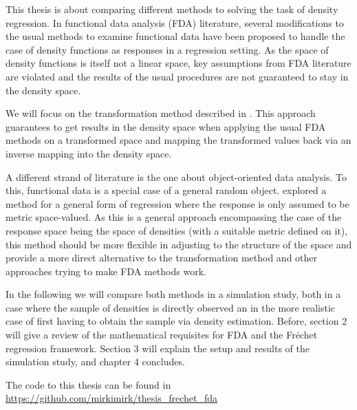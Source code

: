 This thesis is about comparing different methods to solving the task of density
regression. In functional data analysis (FDA) literature, several modifications to
the usual methods to examine functional data have been proposed to handle the case of
density functions as responses in a regression setting. As the space of density functions is itself
not a linear space, key assumptions from FDA literature are violated and the results
of the usual procedures are not guaranteed to stay in the density space.

We will focus on the transformation method described in \textcite{PetersenMüller2016}.
This approach guarantees to get results in the density space when applying the usual
FDA methods on a transformed space and mapping the transformed values back via an
inverse mapping into the density space.

A different strand of literature is the one about object-oriented data analysis. To this,
functional data is a special case of a general random object. \textcite{PetersenMüller2019}
explored a method for a general form of regression where the response is only assumed to
be metric space-valued. As this is a general approach encompassing the case of the
response space being the space of densities (with a suitable metric defined on it),
this method should be more flexible in adjusting to the structure of the space and
provide a more direct alternative to the transformation method and other approaches
trying to make FDA methods work.

In the following we will compare both methods in a simulation study, both in a case
where the sample of densities is directly observed an in the more realistic case of
first having to obtain the sample via density estimation. Before, section 2 will give
a review of the mathematical requisites for FDA and the Fréchet regression framework.
Section 3 will explain the setup and results of the simulation study, and chapter 4
concludes.

The code to this thesis can be found in \url{https://github.com/mirkimirk/thesis_frechet_fda}